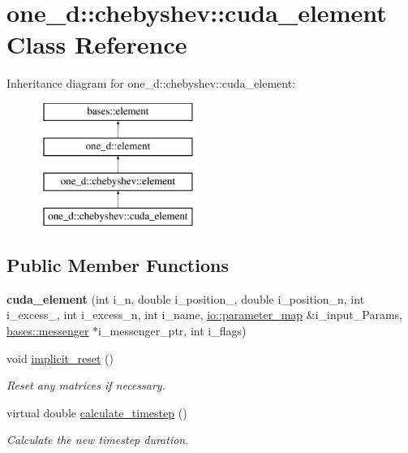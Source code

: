 \hypertarget{classone__d_1_1chebyshev_1_1cuda__element}{\section{one\-\_\-d\-:\-:chebyshev\-:\-:cuda\-\_\-element Class Reference}
\label{classone__d_1_1chebyshev_1_1cuda__element}
}
Inheritance diagram for one\-\_\-d\-:\-:chebyshev\-:\-:cuda\-\_\-element\-:\begin{figure}[H]
\begin{center}
\leavevmode
\includegraphics[height=4.000000cm]{classone__d_1_1chebyshev_1_1cuda__element}
\end{center}
\end{figure}
\subsection*{Public Member Functions}
\begin{DoxyCompactItemize}
\item 
\hypertarget{classone__d_1_1chebyshev_1_1cuda__element_a2a501d087aa0072a5feb79a594b108a3}{{\bfseries cuda\-\_\-element} (int i\-\_\-n, double i\-\_\-position\-\_, double i\-\_\-position\-\_\-n, int i\-\_\-excess\-\_, int i\-\_\-excess\-\_\-n, int i\-\_\-name, \hyperlink{namespaceio_a1c55c654666eeece6a9724f453fdbd87}{io\-::parameter\-\_\-map} \&i\-\_\-input\-\_\-\-Params, \hyperlink{classbases_1_1messenger}{bases\-::messenger} $\ast$i\-\_\-messenger\-\_\-ptr, int i\-\_\-flags)}\label{classone__d_1_1chebyshev_1_1cuda__element_a2a501d087aa0072a5feb79a594b108a3}

\item 
void \hyperlink{classone__d_1_1chebyshev_1_1cuda__element_ac304ac234f63b576d3acab5c31c9a31f}{implicit\-\_\-reset} ()
\begin{DoxyCompactList}\small\item\em Reset any matrices if necessary. \end{DoxyCompactList}\item 
virtual double \hyperlink{classone__d_1_1chebyshev_1_1cuda__element_a528350be3f4edf1470ca31576b3f7ea2}{calculate\-\_\-timestep} ()
\begin{DoxyCompactList}\small\item\em Calculate the new timestep duration. \end{DoxyCompactList}\end{DoxyCompactItemize}
